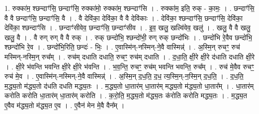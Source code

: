 \documentclass[17pt]{extarticle}
\begin{document}
1. रुक्का॑म॒ श्छन्दाꣳ॑सि॒ छन्दाꣳ॑सि॒ रुक्का॑मो॒ रुक्का॑म॒ श्छन्दाꣳ॑सि । . रुक्का॑म॒ इति॒ रुक् - का॒मः॒ । . छन्दाꣳ॑सि॒ वै वै छन्दाꣳ॑सि॒ छन्दाꣳ॑सि॒ वै । . वै देवि॑का॒ देवि॑का॒ वै वै देवि॑काः । . देवि॑का॒ श्छन्दाꣳ॑सि॒ छन्दाꣳ॑सि॒ देवि॑का॒ देवि॑का॒ श्छन्दाꣳ॑सि । . छन्दाꣳ॑सीवेव॒ छन्दाꣳ॑सि॒ छन्दाꣳ॑सीव । . इ॒व॒ खलु॒ खल्वि॑वेव॒ खलु॑ । . खलु॒ वै वै खलु॒ खलु॒ वै । . वै रुग् रुग् वै वै रुक् । . रुक् छन्दो॑भि॒ श्छन्दो॑भी॒ रुग् रुक् छन्दो॑भिः । . छन्दो॑भि रे॒वैव छन्दो॑भि॒ श्छन्दो॑भि रे॒व । . छन्दो॑भि॒रिति॒ छन्दः॑ - भिः॒ । . ए॒वास्मि॑न्-नस्मिन्-ने॒वै वास्मिन्न्॑ । . अ॒स्मि॒न् रुचꣳ॒॒ रुच॑ मस्मिन्-नस्मि॒न् रुच᳚म् । . रुच॑म् दधाति दधाति॒ रुचꣳ॒॒ रुच॑म् दधाति । . द॒धा॒ति॒ क्षी॒रे क्षी॒रे द॑धाति दधाति क्षी॒रे । . क्षी॒रे भ॑वन्ति भवन्ति क्षी॒रे क्षी॒रे भ॑वन्ति । . भ॒व॒न्ति॒ रुचꣳ॒॒ रुच॑म् भवन्ति भवन्ति॒ रुच᳚म् । . रुच॑ मे॒वैव रुचꣳ॒॒ रुच॑ मे॒व । . ए॒वास्मि॑न्-नस्मिन्-ने॒वै वास्मिन्न्॑ । . अ॒स्मि॒न् द॒ध॒ति॒ द॒ध॒ त्य॒स्मि॒न्-न॒स्मि॒न् द॒ध॒ति॒ । . द॒ध॒ति॒ म॒द्ध्य॒तो म॑द्ध्य॒तो द॑धति दधति मद्ध्य॒तः । . म॒द्ध्य॒तो धा॒तार॑म् धा॒तार॑म् मद्ध्य॒तो म॑द्ध्य॒तो धा॒तार᳚म् । . धा॒तार॑म् करोति करोति धा॒तार॑म् धा॒तार॑म् करोति । . क॒रो॒ति॒ म॒द्ध्य॒तो म॑द्ध्य॒तः क॑रोति करोति मद्ध्य॒तः । . म॒द्ध्य॒त ए॒वैव म॑द्ध्य॒तो म॑द्ध्य॒त ए॒व । . ए॒वैन॑ मेन मे॒वै वैन᳚म् । \newline
\end{document}
